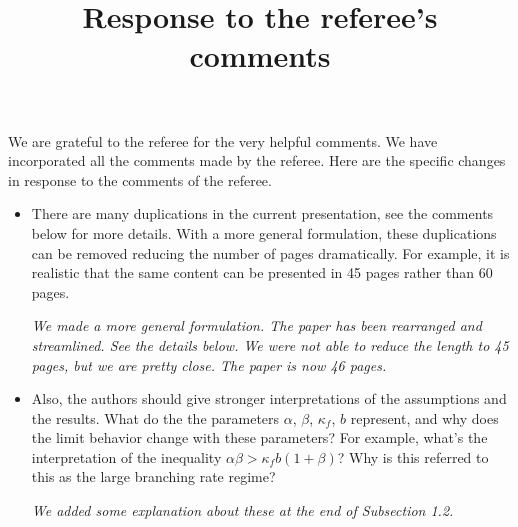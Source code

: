 \documentclass[12pt,a4paper]{amsart}
\title[Response]{\large Response to the referee's comments}
\begin{document}
\maketitle	
	We are grateful to the referee for the very helpful comments.
We have incorporated all the comments made by the referee.
Here are the specific changes in response to the comments of the referee.

\begin{itemize}
\item
There are many duplications in the current presentation, see the comments below for more details.
With a more general formulation, these duplications can be removed reducing the number of pages
dramatically. For example, it is realistic that the same content can be presented in 45 pages rather
than 60 pages.

\emph{We made a more general formulation. The paper has been rearranged and streamlined.
See the details below. We were not able to reduce the length to 45 pages, but we are pretty close. The paper is now 46 pages.}

\item
Also, the authors should give stronger interpretations of the assumptions and the results. What
do the the parameters $\alpha$, $\beta$, $\kappa_f$, $b$ represent, and why does the limit behavior change with these
parameters? For example, what's the interpretation of the inequality $\alpha\beta > \kappa_f b(1 + \beta)$? Why is
this referred to this as the large branching rate regime?

\emph{We added some explanation about these at the end of Subsection 1.2.}

\end{itemize}
\end{document}

